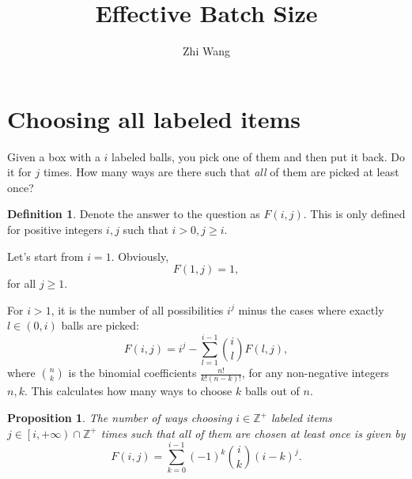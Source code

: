 \documentclass[12pt, letterpaper]{article}
\title{Effective Batch Size}
\author{Zhi Wang}
\newcommand{\inte}{\mathbb{Z}}
\newtheorem{prop}{Proposition}[section]
\theoremstyle{definition}
\newtheorem*{def*}{Definition}
\theoremstyle{remark}
\begin{document}
	
	\maketitle
	
	\tableofcontents
	
	\section{Choosing all labeled items}
	
	Given a box with a $i$ labeled balls, you pick one of them and then put it back.
	Do it for $j$ times.
	How many ways are there such that \textit{all} of them are picked at least once?
	
	\begin{def*}
		Denote the answer to the question as $F(i,j)$. This is only defined for positive integers $i, j$ such that $i>0,j \ge i$.
	\end{def*}
	
	Let's start from $i=1$. Obviously,
	\begin{equation}\label{eqF1j}
		F(1,j)=1,
	\end{equation}
	for all $j \ge 1$.
	
	For $i>1$, it is the number of all possibilities $i^j$ minus the cases where exactly $l\in(0,i)$ balls are picked:
	\begin{equation}\label{eqFijrecur}
		F(i,j)=i^j-\sum_{l=1}^{i-1}\binom{i}{l}F(l,j),
	\end{equation}
	where $\binom{n}{k}$ is the binomial coefficients $\frac{n!}{k!(n-k)!}$, for any non-negative integers $n, k$.
	This calculates how many ways to choose $k$ balls out of $n$.
	
	\begin{prop}
		The number of ways choosing $i\in \inte^+$ labeled items $j \in \left[i,+\infty\right)\cap\inte^+$ times such that all of them are chosen at least once is given by
		\begin{equation}\label{eqFij}
			F(i,j)=\sum_{k=0}^{i-1}(-1)^k\binom{i}{k}\left(i-k\right)^j.
		\end{equation}
	\end{prop}
\end{document}
